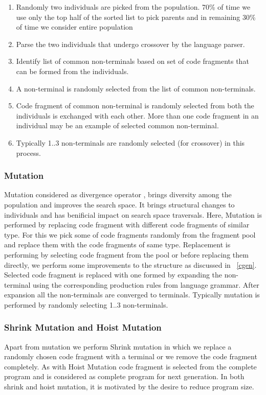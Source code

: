 \documentclass{acm_proc_article-sp}
\begin{document}
\begin{enumerate}
\item Randomly two individuals are picked from the population. 70\% of time we use only the top half of the sorted list to pick parents and in remaining 30\% of time we consider entire population 
\item Parse the two individuals that undergo crossover by the language parser. \item Identify list of common non-terminals based on set of code fragments that can be formed from the individuals.
\item A non-terminal is randomly selected from the list of common non-terminals. 
\item Code fragment of common non-terminal is randomly selected from both the individuals is exchanged with each other. More than one code fragment in an individual may be an example of selected common non-terminal.
\item Typically 1..3 non-terminals are randomly selected (for crossover) in this process. 
\end{enumerate}

\subsubsection{Mutation}
Mutation considered as divergence operator \cite{Byrne10}, brings diversity among the population and improves the search space. It brings structural changes to individuals and has benificial impact on search space traversals. Here, Mutation is performed by replacing code fragment with different code fragments of similar type. For this we pick some of code fragments randomly from the fragment pool and replace them with the code fragments of same type. Replacement is performing by selecting code fragment from the pool or before replacing them directly, we perform some improvements to the structure as discussed in ~\autoref{cgen}. Selected code fragment is replaced with one formed by expanding the non-terminal using the corresponding production rules from language grammar. After expansion all the non-terminals are converged to terminals. Typically mutation is performed by randomly selecting 1..3 non-terminals.

\subsubsection{Shrink Mutation and Hoist Mutation}
Apart from mutation we perform Shrink mutation in which we replace a randomly chosen code fragment with a terminal or we remove the code fragment completely. As with Hoist Mutation code fragment is selected from the complete program and is considered as complete program for next generation. In both shrink and hoist mutation, it is motivated by the desire to reduce program size. 
\end{document}
